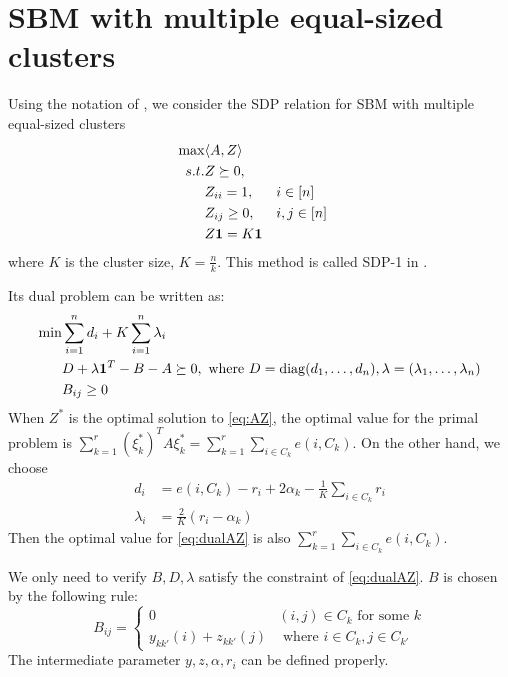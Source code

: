 \documentclass{ctexart}
\DeclareMathOperator{\diag}{diag}
\begin{document}
\section{SBM with multiple equal-sized clusters}
Using the notation of \cite{Hajek16}, we consider the SDP relation for SBM with multiple equal-sized clusters
\begin{align}
\max & \langle A,Z \rangle \notag \\
s.t. & Z \succeq 0, \notag\\
&Z_{ii} = 1,  && i \in [n] \notag\\
&Z_{ij} \geq 0, && i,j \in [n] \notag\\
&Z \mathbf{1} = K\mathbf{1} \label{eq:AZ}
\end{align}
where $K$ is the cluster size, $K=\frac{n}{k}$.
This method is called SDP-1 in \cite{amini2018semidefinite}.

Its dual problem can be written as:
\begin{align}
\min & \sum_{i=1}^n d_i + K \sum_{i=1}^n \lambda_i\notag \\
& D + \lambda \mathbf{1}^T - B - A \succeq 0, \textrm{ where } D=\diag(d_1, \dots, d_n), \lambda=(\lambda_1, \dots, \lambda_n) \notag \\
& B_{ij} \geq 0\label{eq:dualAZ}
\end{align}
When $Z^*$ is the optimal solution to \eqref{eq:AZ}, the optimal value for the primal problem is $\sum_{k=1}^r (\xi^*_k)^T A \xi^*_k
= \sum_{k=1}^r\sum_{i \in C_k} e(i, C_k) $. On the other hand, we choose
\begin{align}
d_i &= e(i, C_k) - r_i + 2\alpha_k  - \frac{1}{K} \sum_{i \in C_k} r_i \\
\lambda_i &= \frac{2}{K}(r_i - \alpha_k)
\end{align}
Then the optimal value for \eqref{eq:dualAZ} is also $\sum_{k=1}^r\sum_{i \in C_k} e(i, C_k) $.

We only need to verify $B, D, \lambda$ satisfy the constraint of \eqref{eq:dualAZ}.
$B$ is chosen by the following rule:
\begin{equation}
B_{ij} = \begin{cases}
0 & (i,j) \in C_k \textrm{ for some } k \\
y_{kk'}(i) + z_{kk'}(j) & \textrm{ where } i \in C_k, j \in C_{k'}
\end{cases}
\end{equation}
The intermediate parameter $y,z,\alpha,r_i$ can be defined properly.
\end{document}
